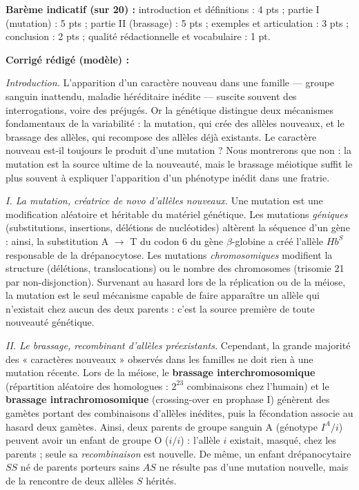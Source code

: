 \documentclass[11pt]{article}
\newcommand{\cle}[1]{{\popxbold\color{popdark}#1}}
\begin{document}
\begin{corrige}
\textbf{Barème indicatif (sur 20) :} introduction et définitions : 4 pts ; partie I (mutation) : 5 pts ; partie II (brassage) : 5 pts ; exemples et articulation : 3 pts ; conclusion : 2 pts ; qualité rédactionnelle et vocabulaire : 1 pt.

\textbf{Corrigé rédigé (modèle) :}

\emph{Introduction.} L'apparition d'un caractère nouveau dans une famille — groupe sanguin inattendu, maladie héréditaire inédite — suscite souvent des interrogations, voire des préjugés. Or la génétique distingue deux mécanismes fondamentaux de la variabilité : la \cle{mutation}, qui crée des allèles nouveaux, et le \cle{brassage} des allèles, qui recompose des allèles déjà existants. Le caractère nouveau est-il toujours le produit d'une mutation ? Nous montrerons que non : la mutation est la source ultime de la nouveauté, mais le brassage méiotique suffit le plus souvent à expliquer l'apparition d'un phénotype inédit dans une fratrie.

\emph{I. La mutation, créatrice \emph{de novo} d'allèles nouveaux.} Une mutation est une modification aléatoire et héritable du matériel génétique. Les mutations \emph{géniques} (substitutions, insertions, délétions de nucléotides) altèrent la séquence d'un gène : ainsi, la substitution A $\to$ T du codon 6 du gène $\beta$-globine a créé l'allèle $Hb^S$ responsable de la drépanocytose. Les mutations \emph{chromosomiques} modifient la structure (délétions, translocations) ou le nombre des chromosomes (trisomie 21 par non-disjonction). Survenant au hasard lors de la réplication ou de la méiose, la mutation est le seul mécanisme capable de faire apparaître un allèle qui n'existait chez aucun des deux parents : c'est la source première de toute nouveauté génétique.

\emph{II. Le brassage, recombinant d'allèles préexistants.} Cependant, la grande majorité des « caractères nouveaux » observés dans les familles ne doit rien à une mutation récente. Lors de la méiose, le \textbf{brassage interchromosomique} (répartition aléatoire des homologues : $2^{23}$ combinaisons chez l'humain) et le \textbf{brassage intrachromosomique} (crossing-over en prophase I) génèrent des gamètes portant des combinaisons d'allèles inédites, puis la fécondation associe au hasard deux gamètes. Ainsi, deux parents de groupe sanguin A (génotype $I^A/i$) peuvent avoir un enfant de groupe O ($i/i$) : l'allèle $i$ existait, masqué, chez les parents ; seule sa \emph{recombinaison} est nouvelle. De même, un enfant drépanocytaire $SS$ né de parents porteurs sains $AS$ ne résulte pas d'une mutation nouvelle, mais de la rencontre de deux allèles $S$ hérités.


\end{corrige}
\end{document}
